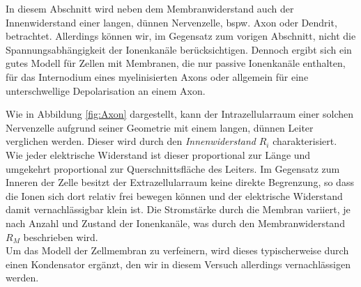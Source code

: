 In diesem Abschnitt wird neben dem Membranwiderstand auch der Innenwiderstand einer langen, dünnen Nervenzelle, bspw. Axon oder Dendrit, betrachtet. Allerdings können wir, im Gegensatz zum vorigen Abschnitt, nicht die Spannungsabhängigkeit der Ionenkanäle berücksichtigen. Dennoch ergibt sich ein gutes Modell für Zellen mit Membranen, die nur passive Ionenkanäle enthalten, für das Internodium eines myelinisierten Axons oder allgemein für eine unterschwellige Depolarisation an einem Axon.

\noindent
Wie in Abbildung \ref{fig:Axon} dargestellt, kann der Intrazellularraum einer solchen Nervenzelle aufgrund seiner Geometrie mit einem langen, dünnen Leiter verglichen werden. Dieser wird durch den \textit{Innenwiderstand} $R_i$ charakterisiert. Wie jeder elektrische Widerstand ist dieser proportional zur Länge und umgekehrt proportional zur Querschnittsfläche des Leiters. Im Gegensatz zum Inneren der Zelle besitzt der Extrazellularraum keine direkte Begrenzung, so dass die Ionen sich dort relativ frei bewegen können und der elektrische Widerstand damit vernachlässigbar klein ist. Die Stromstärke durch die Membran variiert, je nach Anzahl und Zustand der Ionenkanäle, was durch den Membranwiderstand $R_M$ beschrieben wird.\\
Um das Modell der Zellmembran zu verfeinern, wird dieses typischerweise durch einen Kondensator ergänzt, den wir in diesem Versuch allerdings vernachlässigen werden.\\

